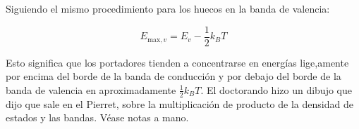 \begin{texercise}
\begin{enumerate}[label=\alph*)]
		      Siguiendo el mismo procedimiento para los huecos en la banda de valencia:

		      \[
			      E_{\text{max}, v} = E_v - \frac{1}{2} k_B T
		      \]

		      Esto significa que los portadores tienden a concentrarse en energías lige,amente por encima del borde de la banda de conducción y por debajo del borde de la banda de valencia en aproximadamente \( \frac{1}{2} k_B T \). El doctorando hizo un dibujo que dijo que sale en el Pierret, sobre la multiplicación de producto de la densidad de estados y las bandas. Véase notas a mano.

	\end{enumerate}
\end{texercise}


